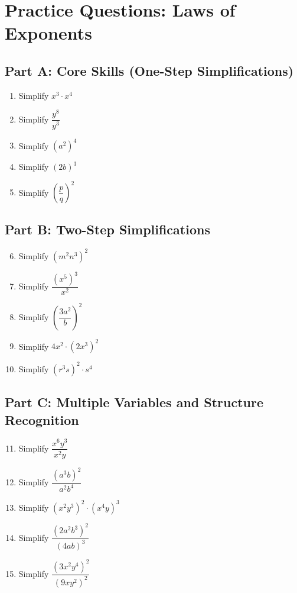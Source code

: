\documentclass[14pt]{extarticle}
\begin{document}
\section*{Practice Questions: Laws of Exponents}

\subsection*{Part A: Core Skills (One-Step Simplifications)}
\begin{enumerate}
  \item Simplify \(x^3 \cdot x^4\)
  \item Simplify \(\dfrac{y^8}{y^3}\)
  \item Simplify \((a^2)^4\)
  \item Simplify \((2b)^3\)
  \item Simplify \(\left(\dfrac{p}{q}\right)^2\)
\end{enumerate}

\subsection*{Part B: Two-Step Simplifications}
\begin{enumerate}
  \setcounter{enumi}{5}
  \item Simplify \((m^2n^3)^2\)
  \item Simplify \(\dfrac{(x^5)^3}{x^2}\)
  \item Simplify \(\left(\dfrac{3a^2}{b}\right)^2\)
  \item Simplify \(4x^2 \cdot (2x^3)^2\)
  \item Simplify \((r^3s)^2 \cdot s^4\)
\end{enumerate}

\subsection*{Part C: Multiple Variables and Structure Recognition}
\begin{enumerate}
  \setcounter{enumi}{10}
  \item Simplify \(\dfrac{x^6y^3}{x^2y}\)
  \item Simplify \(\dfrac{(a^3b)^2}{a^2b^4}\)
  \item Simplify \((x^2y^3)^2 \cdot (x^4y)^3\)
  \item Simplify \(\dfrac{(2a^2b^3)^2}{(4ab)^3}\)
  \item Simplify \(\dfrac{(3x^2y^4)^2}{(9xy^2)^2}\)
\end{enumerate}
\end{document}

